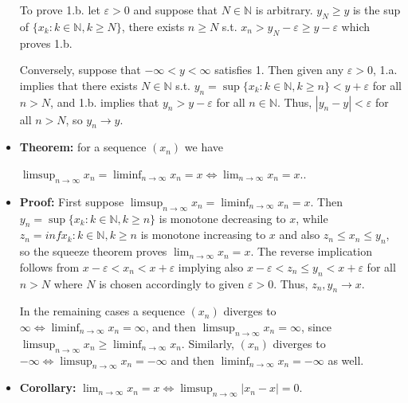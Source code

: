 \documentclass{article}
\begin{document}
\begin{itemize}
    To prove 1.b. let $\varepsilon > 0$ and suppose that $N \in \mathbb{N}$ is arbitrary. $y_N \ge y$ is the sup of $\{x_k: k \in \mathbb{N}, k \ge N\}$, there exists $n \ge N$ s.t. $x_n > y_N - \varepsilon \ge y - \varepsilon$ which proves 1.b. 
    
    Conversely, suppose that $-\infty < y < \infty$ satisfies 1. Then given any $\varepsilon > 0$, 1.a. implies that there exists $N \in \mathbb{N}$ s.t. $y_n = \sup\{x_k: k \in \mathbb{N}, k \ge n\} < y + \varepsilon$ for all $n > N$, and 1.b. implies that $y_n > y - \varepsilon$ for all $n \in \mathbb{N}$. Thus, $|y_n - y| < \varepsilon$ for all $n > N$, so $y_n \to y$.

    \item \textbf{Theorem:} for a sequence $(x_n)$ we have 
    
    $\displaystyle \limsup_{n\to\infty} x_n = \liminf_{n\to\infty} x_n = x \iff \lim_{n\to\infty} x_n = x.$. 
    \item \textbf{Proof:} First suppose $\displaystyle \limsup_{n\to\infty} x_n = \liminf_{n\to\infty} x_n = x$. Then $y_n = \sup\{x_k: k \in \mathbb{N}, k \geq n\}$ is monotone decreasing to $x$, while $z_n = inf{x_k: k \in \mathbb{N}, k \geq n}$ is monotone increasing to $x$ and also $z_n \leq x_n \leq y_n$, so the squeeze theorem proves $\displaystyle \lim_{n\to\infty} x_n = x$. The reverse implication follows from $x - \varepsilon < x_n < x + \varepsilon$ implying also $x - \varepsilon < z_n \leq y_n < x + \varepsilon$ for all $n > N$ where $N$ is chosen accordingly to given $\varepsilon > 0$. Thus, $z_n, y_n \to x$.

    In the remaining cases a sequence $(x_n)$ diverges to $\displaystyle \infty \iff \liminf_{n\to\infty} x_n = \infty$, and then $\displaystyle \limsup_{n\to\infty} x_n = \infty$, since $\displaystyle \limsup_{n\to\infty} x_n \geq \liminf_{n\to\infty} x_n$. Similarly, $(x_n)$ diverges to $\displaystyle -\infty \iff \limsup_{n\to\infty} x_n = -\infty$ and then $\displaystyle \liminf_{n\to\infty} x_n = -\infty$ as well. 
    \item \textbf{Corollary:} $\displaystyle \lim_{n\to\infty} x_n = x \iff \limsup_{n\to\infty} |x_n - x| = 0$.
\end{itemize}
\end{document}
